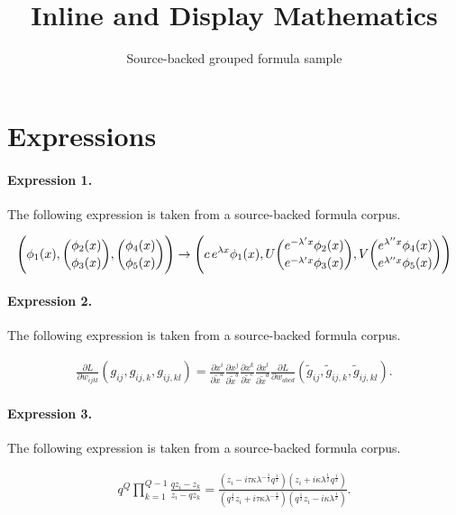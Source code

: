 \documentclass[11pt]{article}
\title{Inline and Display Mathematics}
\author{Source-backed grouped formula sample}
\date{}
\begin{document}
\maketitle
\section{Expressions}
\paragraph{Expression 1.} The following expression is taken from a source-backed formula corpus.

\begin{align*}\Biggl( \phi_1(x), {\phi_2(x)\choose\phi_3(x)},{\phi_4(x)\choose\phi_5(x)} \Biggr) \rightarrow \Biggl( c\, e\sp{\lambda x} \phi_1(x), U {e\sp{-\lambda\sp\prime x}\phi_2(x)\choose e\sp{-\lambda\sp\prime x}\phi_3(x)},V {e\sp{\lambda\sp{\prime\prime}x} \phi_4(x)\choose e\sp{\lambda\sp{\prime\prime}x} \phi_5(x)} \Biggr)\end{align*}

\paragraph{Expression 2.} The following expression is taken from a source-backed formula corpus.

\begin{align*}\frac{\partial L}{\partial w_{ijkl}}(g_{ij},g_{ij,k},g_{ij,kl})=\frac{\partial x^i}{\partial \tilde{x}^a}\frac{\partial x^j}{\partial \tilde{x}^b}\frac{\partial x^k}{\partial \tilde{x}^c}\frac{\partial x^l}{\partial \tilde{x}^d}\frac{\partial L}{\partial w_{abcd}}(\tilde{g}_{ij},\tilde{g}_{ij,k},\tilde{g}_{ij,kl}).\end{align*}

\paragraph{Expression 3.} The following expression is taken from a source-backed formula corpus.

\begin{align*}q^{Q}\prod_{k=1}^{Q-1}\frac{qz_i-z_k}{z_i-qz_k} = \frac{\left(z_i-i\tau\kappa \lambda^{-\frac{1}{2}}q^{\frac{1}{2}}\right) \left(z_i +i\kappa \lambda^{\frac{1}{2}}q^{\frac{1}{2}}\right)} {\left(q^{\frac{1}{2}}z_i+i\tau\kappa\lambda^{-\frac{1}{2}}\right) \left(q^{\frac{1}{2}}z_i-i\kappa\lambda^{\frac{1}{2}}\right)}.\end{align*}
\end{document}
